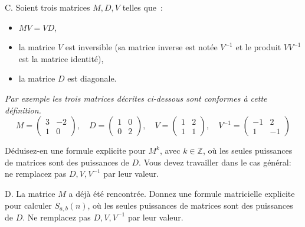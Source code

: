 \documentclass[11pt]{article}
\newcommand\comment{}
\def\R{\mathbb R}
\def\Z{\mathbb Z}
\begin{document}
\medskip
C. Soient trois matrices $M, D, V$ telles que~: 

\begin{itemize}

\item $MV=VD$,
\item la matrice $V$ est inversible (sa matrice inverse est notée  $V^{-1}$ et le produit $V V^{-1}$ est la matrice identité),
\item la matrice $D$ est diagonale.

\end{itemize}

\medskip
\emph{Par exemple les trois matrices décrites ci-dessous sont 
conformes à cette définition.}
$$M=\left( \begin{array}{cc} 3 & -2\\
1 & 0 
\end{array}\right), \quad D=\left( \begin{array}{cc} 1 & 0 \\
0 & 2 \end{array}\right), \quad V=\left( \begin{array}{cc} 1 & 2 \\
1  & 1 \end{array}\right), \quad V^{-1}=\left( \begin{array}{cc} -1 & 2 \\
1  & -1 \end{array}\right) $$
 


Déduisez-en une formule explicite pour $M^k$, avec $k\in \Z$,
où les seules puissances de matrices sont des puissances de $D$.
Vous devez travailler dans le cas général: ne remplacez pas $D, V, V^{-1}$ par leur valeur.


\medskip
D. La matrice $M$ a déjà été rencontrée. Donnez une formule matricielle explicite pour calculer $S_{a,b}(n)$, où les seules puissances de matrices sont des puissances de $D$.
Ne remplacez pas $D, V, V^{-1}$ par leur valeur.
\end{document}
